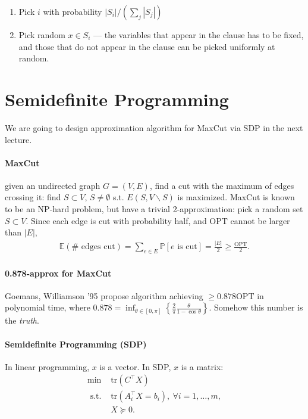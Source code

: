 \documentclass[11pt]{article}
\newcommand{\txtst}{\text{ s.t. }}
\newcommand{\opt}{\mathrm{OPT}}
\newcommand{\tr}{\mathrm{tr}}
\theoremstyle{definition}
\theoremstyle{remark}
\begin{document}
\begin{enumerate}[{Step} 1.]
	\item Pick $i$ with probability $|S_i| / (\sum_j |S_j|)$
	\item Pick random $x \in S_i$ --- the variables that appear in the clause has to be fixed, and those that do not appear in the clause can be picked uniformly at random.
\end{enumerate}

\section{Semidefinite Programming}

We are going to design approximation algorithm for MaxCut via SDP in the next lecture.


\paragraph{MaxCut} given an undirected graph $G = (V,E)$, find a cut with the maximum of edges crossing it: find $S \subset V$, $S \neq \emptyset$ s.t. $E(S, V \backslash S)$ is maximized.  MaxCut is known to be an NP-hard problem, but have a trivial 2-approximation: 
%
pick a random set $S \subset V$. Since each edge is cut with probability half, and $\opt$ cannot be larger than $|E|$,
\begin{align*}
	\mathbb{E}(\# \text{ edges cut}) = \sum_{e \in E} \mathbb{P}[ e \text{ is cut}] = \frac{|E|}{2} \geq \frac{\opt}{2}.
\end{align*}

\paragraph{0.878-approx for MaxCut} Goemans, Williamson '95 \cite{GoemansW95} propose algorithm achieving $\geq 0.878 \opt$ in polynomial time, where  $0.878  = \inf_{\theta \in [0, \pi]} \left\lbrace \frac{2}{\pi} \frac{\theta}{1-\cos \theta} \right\rbrace$. Somehow this number is the \emph{truth}.


\paragraph{Semidefinite Programming (SDP)} In linear programming, $x$ is a vector. In SDP, $x$ is a matrix:
\begin{align*}
	\min~& \tr(C^\intercal X) \\
	\txtst & \tr(A_i^\intercal X = b_i), ~\forall i = 1, \dots, m,\\
	& X \succeq 0.
\end{align*}
\end{document}

